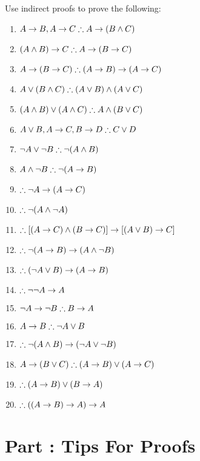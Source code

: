 \problempart
Use indirect proofs to prove the following:
\begin{enumerate}
\item $A \eif B, A \eif C \therefore A \eif (B \eand C)$
\item $(A \eand B) \eif C \therefore A \eif (B \eif C)$
\item $A \eif (B \eif C) \therefore (A \eif B) \eif (A \eif C)$
\item $A \eor (B \eand C) \therefore (A \eor B) \eand (A \eor C)$
\item $(A \eand B) \eor (A \eand C) \therefore A \eand (B \eor C)$
\item $A \eor B, A \eif C, B \eif D \therefore C \eor D$
\item $\enot A \lor \enot B \therefore \enot(A \eand B)$
\item $A \eand \enot B \therefore \enot(A \eif B)$
\item $\therefore \enot A \eif (A \eif C)$
\item $\therefore \enot(A \eand \enot A)$
\item $\therefore [(A \eif C) \eand (B \eif C)] \eif [(A \lor B) \eif C]$
\item $\therefore \enot(A \eif B) \eif (A \eand \enot B)$
\item $\therefore (\enot A \eor B) \eif (A \eif B)$
\item $\therefore \enot\enot A \eif A$
\item $\enot A \eif \enot B \therefore B \eif A$
\item $A \eif B \therefore \enot A \eor B$
\item $\therefore \enot(A \eand B) \eif (\enot A \eor \enot B)$
\item $A \eif (B \eor C) \therefore (A \eif B) \eor (A \eif C)$
\item $\therefore (A \eif B) \lor (B \eif A)$
\item $\therefore ((A \eif B) \eif A) \eif A$
\end{enumerate}
\setcounter{seccount}{1}
\chapter{Part \thechapcount: Tips For Proofs}\label{tips.pl}
